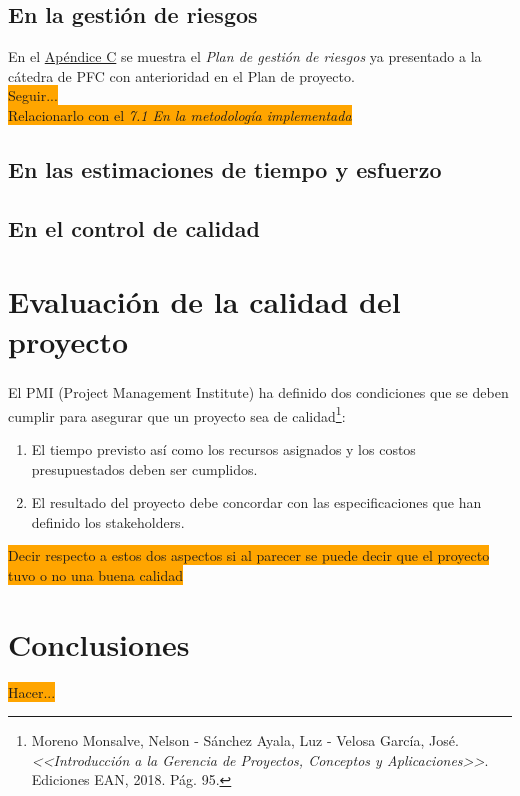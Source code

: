 \documentclass[a4paper, 12pt,twoside]{report}  %
\numberwithin{equation}{subsection} %
\begin{document}
\section{En la gestión de riesgos}
En el \hyperlink{apendice_c}{Apéndice C} se muestra el \textit{Plan de gestión de riesgos} ya presentado a la cátedra de PFC con anterioridad en el Plan de proyecto.\\
\colorbox{orange}{Seguir...}\\
\colorbox{orange}{Relacionarlo con el \textit{7.1 En la metodología implementada}}

\section{En las estimaciones de tiempo y esfuerzo}

\section{En el control de calidad}

\chapter{Evaluación de la calidad del proyecto}

El PMI\textsuperscript{\tiny\textregistered} (Project Management Institute) ha definido dos condiciones que se deben cumplir para asegurar que un proyecto sea de calidad\footnote{Moreno Monsalve, Nelson - Sánchez Ayala, Luz - Velosa García, José. \textit{<<Introducción a la Gerencia de Proyectos, Conceptos y Aplicaciones>>}. Ediciones EAN, 2018. Pág. 95.}:
\begin{enumerate}
\item El tiempo previsto así como los recursos asignados y los costos presupuestados deben ser cumplidos.
\item El resultado del proyecto debe concordar con las especificaciones que han definido los stakeholders.
\end{enumerate}

\colorbox{orange}{Decir respecto a estos dos aspectos si al parecer se puede decir que el proyecto tuvo o no una buena calidad}\\

\chapter{Conclusiones}
\colorbox{orange}{Hacer...}
\end{document}
